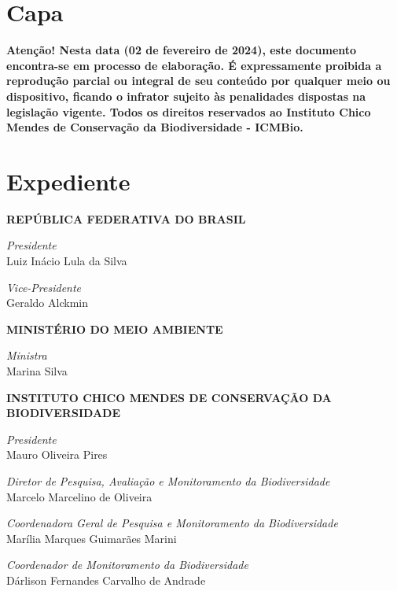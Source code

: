 \documentclass[
  letterpaper,
]{scrbook}
\author{}
\date{}
\renewcommand*\contentsname{Índice}
\newcommand\contentsname{Índice}
\begin{document}
\frontmatter

\renewcommand*\contentsname{Índice}
{
\setcounter{tocdepth}{2}
\tableofcontents
}
\mainmatter
{}

\chapter*{Capa}\label{inicio}


\pagestyle{plain}

\textbf{Atenção! Nesta data (02 de fevereiro de 2024), este documento
encontra-se em processo de elaboração. É expressamente proibida a
reprodução parcial ou integral de seu conteúdo por qualquer meio ou
dispositivo, ficando o infrator sujeito às penalidades dispostas na
legislação vigente. Todos os direitos reservados ao Instituto Chico
Mendes de Conservação da Biodiversidade - ICMBio.}


\chapter*{Expediente}\label{expediente}


\textbf{REPÚBLICA FEDERATIVA DO BRASIL}

\emph{Presidente}\\
Luiz Inácio Lula da Silva

\emph{Vice-Presidente}\\
Geraldo Alckmin

\textbf{MINISTÉRIO DO MEIO AMBIENTE}

\emph{Ministra}\\
Marina Silva

\textbf{INSTITUTO CHICO MENDES DE CONSERVAÇÃO DA BIODIVERSIDADE}

\emph{Presidente}\\
Mauro Oliveira Pires

\emph{Diretor de Pesquisa, Avaliação e Monitoramento da
Biodiversidade}\\
Marcelo Marcelino de Oliveira

\emph{Coordenadora Geral de Pesquisa e Monitoramento da
Biodiversidade}\\
Marília Marques Guimarães Marini

\emph{Coordenador de Monitoramento da Biodiversidade}\\
Dárlison Fernandes Carvalho de Andrade
\end{document}
